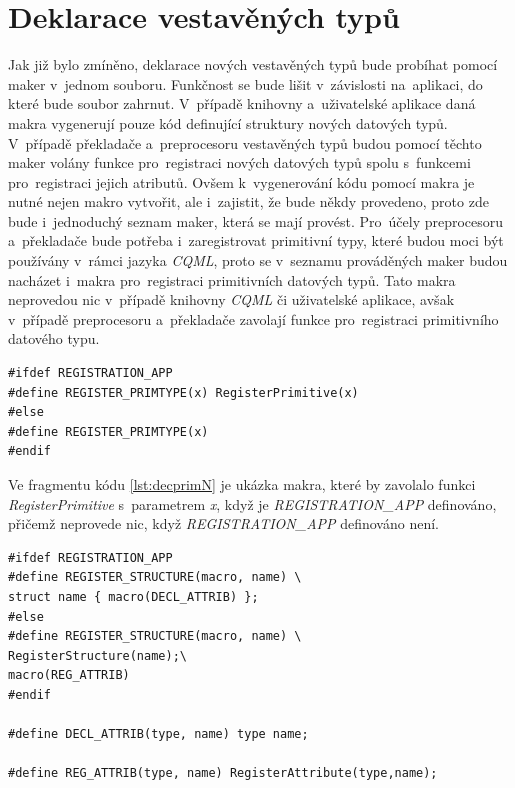 \documentclass[11pt,twoside,a4paper]{book}
\begin{document}
\section{\label{SEC:macN}Deklarace vestavěných typů}
Jak již bylo zmíněno, deklarace nových vestavěných typů bude probíhat pomocí maker v~jednom souboru. Funkčnost se bude lišit v~závislosti na~aplikaci, do které bude soubor zahrnut. V~případě knihovny a~uživatelské aplikace daná makra vygenerují pouze kód definující struktury nových datových typů. V~případě překladače a~preprocesoru vestavěných typů budou pomocí těchto maker volány funkce pro~registraci nových datových typů spolu s~funkcemi pro~registraci jejich atributů. Ovšem k~vygenerování kódu pomocí makra je nutné nejen makro vytvořit, ale i~zajistit, že bude někdy provedeno, proto zde bude i~jednoduchý seznam maker, která se mají provést. Pro~účely preprocesoru a~překladače bude potřeba i~zaregistrovat primitivní typy, které budou moci být používány v~rámci jazyka \textit{CQML}, proto se v~seznamu prováděných maker budou nacházet i~makra pro~registraci primitivních datových typů. Tato makra neprovedou nic v~případě knihovny \textit{CQML} či uživatelské aplikace, avšak v~případě preprocesoru a~překladače zavolají funkce pro~registraci primitivního datového typu.

\begin{lstlisting}[float,frame=single,caption={Makro registrující datový typ v~případě, že je definováno jiné makro.},label=lst:decprimN]
#ifdef REGISTRATION_APP
#define REGISTER_PRIMTYPE(x) RegisterPrimitive(x)
#else
#define REGISTER_PRIMTYPE(x)
#endif
\end{lstlisting}
Ve fragmentu kódu \ref{lst:decprimN} je ukázka makra, které by zavolalo funkci \textit{RegisterPrimitive} s~parametrem \textit{x}, když je \textit{REGISTRATION\_APP} definováno, přičemž neprovede nic, když \textit{REGISTRATION\_APP} definováno není.


\begin{lstlisting}[frame=single,caption=Makro\, které registruje strukturu nebo vypíše její deklaraci\, v~závislosti na~jiném makru. ,label=lst:decN]
#ifdef REGISTRATION_APP
#define REGISTER_STRUCTURE(macro, name) \
struct name { macro(DECL_ATTRIB) };
#else
#define REGISTER_STRUCTURE(macro, name) \
RegisterStructure(name);\
macro(REG_ATTRIB) 
#endif

#define DECL_ATTRIB(type, name) type name;

#define REG_ATTRIB(type, name) RegisterAttribute(type,name);
\end{lstlisting}
  
\end{document}

